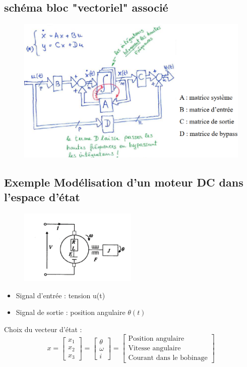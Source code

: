 \documentclass[document.tex]{subfiles}
\begin{document}
\subsection{schéma bloc "vectoriel" associé}

\begin{figure}[H]
    \centering
    \includegraphics[width=\textwidth]{Include/Figure/14.png}
\end{figure}


\subsection{Exemple Modélisation d'un moteur DC dans l'espace d'état}
\begin{figure}[H]
    \centering
    \includegraphics[width=0.5\textwidth]{Include/Figure/20.png}
\end{figure}
\begin{itemize}
\item Signal d'entrée : tension u(t)
\item Signal de sortie : position angulaire $\theta(t)$
\end{itemize}
Choix du vecteur d'état :
\begin{equation}
	x = \begin{bmatrix}
	 x_1 \\ x_2 \\ x_3
	\end{bmatrix} = \begin{bmatrix}
	\theta \\ \omega \\ i
	\end{bmatrix} = \begin{bmatrix}
	\text{Position angulaire} \\ \text{Vitesse angulaire} \\ \text{Courant dans le bobinage}
	\end{bmatrix}
\end{equation}
\end{document}
